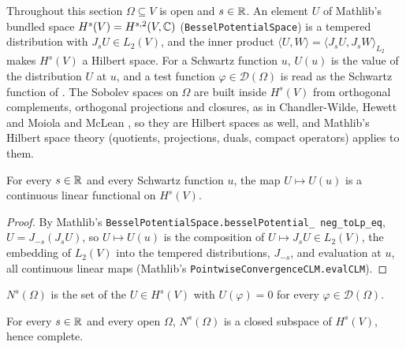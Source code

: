 Throughout this section $\Omega \subseteq V$ is open and $s \in \mathbb{R}$. An element $U$ of Mathlib's
bundled space $H^s(V) = H^{s,2}(V, \mathbb{C})$ (\texttt{BesselPotentialSpace}) is a tempered
distribution with $J_s U \in L_2(V)$, and the inner product
$\langle U, W \rangle = \langle J_s U, J_s W \rangle_{L_2}$ makes $H^s(V)$ a Hilbert space. For
a Schwartz function $u$, $U(u)$ is the value of the distribution $U$ at $u$, and a test function
$\varphi \in \mathcal D(\Omega)$ is read as the Schwartz function of .
The Sobolev spaces on $\Omega$ are built inside $H^s(V)$ from orthogonal complements, orthogonal
projections and closures, as in Chandler-Wilde, Hewett and Moiola
\cite[\S 3.1]{ChandlerWildeHewettMoiola} and McLean \cite[Chapter 3]{McLean}, so they are
Hilbert spaces as well, and Mathlib's Hilbert space theory (quotients, projections, duals,
compact operators) applies to them.

\begin{lemma}
\label{lem:sobolev-evaluation-continuous}
\leanok
For every $s \in \mathbb{R}$ and every Schwartz function $u$, the map $U \mapsto U(u)$ is a continuous
linear functional on $H^s(V)$.
\end{lemma}

\begin{proof}
\leanok
By Mathlib's \texttt{BesselPotentialSpace.\allowbreak besselPotential\_\allowbreak
neg\_\allowbreak toLp\_\allowbreak eq}, $U = J_{-s}(J_s U)$, so $U \mapsto U(u)$ is the
composition of $U \mapsto J_s U \in L_2(V)$, the embedding of $L_2(V)$ into the tempered
distributions, $J_{-s}$, and evaluation at $u$, all continuous linear maps (Mathlib's
\texttt{PointwiseConvergenceCLM.\allowbreak evalCLM}).
\end{proof}

\begin{definition}
\label{def:sobolev-vanishing}
\leanok
{}
$N^s(\Omega)$ is the set of the $U \in H^s(V)$ with $U(\varphi) = 0$ for every
$\varphi \in \mathcal D(\Omega)$.
\end{definition}

\begin{lemma}
\label{lem:sobolev-vanishing-closed}
\leanok
{}
For every $s \in \mathbb{R}$ and every open $\Omega$, $N^s(\Omega)$ is a closed subspace of $H^s(V)$,
hence complete.
\end{lemma}

